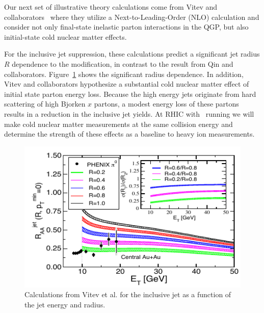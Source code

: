 Our next set of illustrative theory calculations come from Vitev and
collaborators~\cite{He:2011pd,Neufeld:2011yh,Vitev:2009rd} where they
utilize a Next-to-Leading-Order (NLO) calculation and consider not only
final-state inelastic parton interactions in the QGP, but also initial-state cold
nuclear matter effects.  

For the inclusive jet suppression, these calculations predict a
significant jet radius $R$ dependence to the modification, in contrast
to the result from Qin and collaborators.
Figure~\ref{fig:vitev_raasize} shows the significant radius
dependence.  In addition, Vitev and collaborators hypothesize a
substantial cold nuclear matter effect of initial state parton energy
loss.  Because the high energy jets originate from hard scattering of
high Bjorken $x$ partons, a modest energy loss of these partons
results in a reduction in the inclusive jet yields.  At RHIC with
\dAu~running we will make cold nuclear matter measurements at the same
collision energy and determine the strength of these effects as a
baseline to heavy ion measurements.

\begin{figure}[t]
 \begin{center}
    \includegraphics[width=0.6\linewidth]{figs/vitev_auau_RHIC_jetRAA}
    \caption[Calculations by Vitev et al. for the inclusive jet \raa
    vs jet energy and radius]{\label{fig:vitev_raasize} Calculations
      from Vitev et al. for the inclusive jet \raa as a function of
      the jet energy and radius.  }
 \end{center}
\end{figure}

